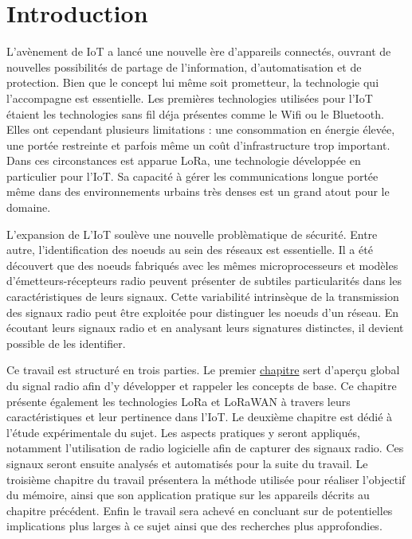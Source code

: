 

\chapter*{Introduction}

\renewcommand{\leftmark}{INTRODUCTION}

L'avènement de \ac{IoT} a lancé une nouvelle ère d'appareils connectés, ouvrant de nouvelles possibilités de partage de l'information, d'automatisation et de protection. Bien que le concept lui même soit prometteur, la technologie qui l'accompagne est essentielle.
Les premières technologies utilisées pour l'\ac{IoT} étaient les technologies sans fil déja présentes comme le Wifi ou le Bluetooth. Elles ont cependant plusieurs limitations : une consommation en énergie élevée, une portée restreinte et parfois même un coût d'infrastructure trop important.
Dans ces circonstances est apparue \ac{LoRa}, une technologie développée en particulier pour l'\ac{IoT}. Sa capacité à gérer les communications longue portée même dans des environnements urbains très denses est un grand atout pour le domaine.

\vspace{0.1cm}

L'expansion de L'\ac{IoT} soulève une nouvelle problèmatique de sécurité. Entre autre, l'identification des noeuds au sein des réseaux est essentielle. Il a été dé\-couvert que des noeuds fabriqués avec les mêmes microprocesseurs et modèles d'émetteurs-récepteurs radio peuvent présenter de subtiles particularités dans les caractéristiques de leurs signaux. Cette variabilité intrinsèque de la transmission des signaux radio peut être exploitée pour distinguer les noeuds d’un réseau. En écoutant leurs signaux radio et en analysant leurs signatures distinctes, il devient possible de les identifier.

\vspace{0.1cm}

Ce travail est structuré en trois parties. Le premier          \hyperref[chap1]{chapitre} sert d'aperçu global du signal radio afin d'y développer et rappeler les concepts de base. Ce chapitre présente également les technologies \ac{LoRa} et LoRaWAN à travers leurs caractéristiques et leur pertinence dans l'\ac{IoT}.
Le deuxième chapitre est dédié à l'étude expérimentale du sujet. Les aspects pratiques y seront appliqués, notamment l'utilisation de radio logicielle afin de capturer des signaux radio. Ces signaux seront ensuite analysés et automatisés pour la suite du travail.
Le troisième chapitre du travail présentera la méthode utilisée pour réaliser l'objectif du mémoire, ainsi que son application pratique sur les appareils décrits au chapitre précédent. Enfin le travail sera achevé en concluant sur de potentielles implications plus larges à ce sujet ainsi que des recherches plus approfondies.

